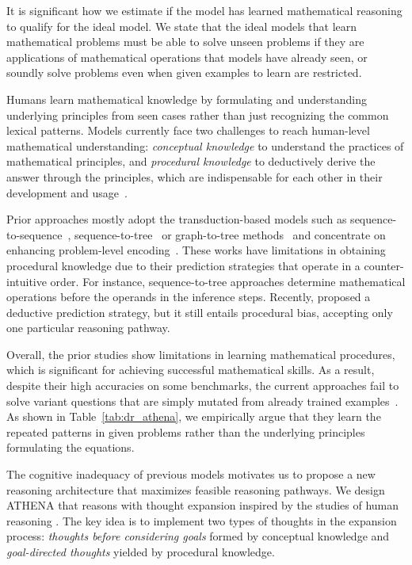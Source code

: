\documentclass[11pt]{article}
\newcommand{\1}{\mathbb{1}}
\begin{document}
It is significant how we estimate if the model has learned mathematical reasoning to qualify for the ideal model.
We state that the ideal models that learn mathematical problems must be able to solve unseen problems if they are applications of mathematical operations that models have already seen, or soundly solve problems even when given examples to learn are restricted.

Humans learn mathematical knowledge by formulating and understanding underlying principles from seen cases rather than just recognizing the common lexical patterns.
Models currently face two challenges to reach human-level mathematical understanding: \textit{conceptual knowledge} to understand the practices of mathematical principles, and \textit{procedural knowledge} to deductively derive the answer through the principles, which are indispensable for each other in their development and usage~\citep{rittle1999conceptual, byrnes1991role, canobi2009concept, rittle-etal-2014-developing}.

Prior approaches mostly adopt the transduction-based models such as sequence-to-sequence~\citep{ling-etal-2017-program, wang-etal-2018-translating}, sequence-to-tree~\citep{xie-sun-2019-goal, liu-etal-2019-tree} or graph-to-tree methods~\citep{zhang-etal-2020-graph-tree, li-etal-2020-graph-tree} and concentrate on enhancing problem-level encoding~\citep{shen-jin-2020-solving, zhang-etal-2020-graph-tree, lin-etal-2021-hms, yu-etal-2021-improving}.
These works have limitations in obtaining procedural knowledge due to their prediction strategies that operate in a counter-intuitive order.
For instance, sequence-to-tree approaches determine mathematical operations before the operands in the inference steps.
Recently, \citet{jie-etal-2022-learning} proposed a deductive prediction strategy, but it still entails procedural bias, accepting only one particular reasoning pathway.

Overall, the prior studies show limitations in learning mathematical procedures, which is significant for achieving successful mathematical skills.
As a result, despite their high accuracies on some benchmarks, the current approaches fail to solve variant questions that are simply mutated from already trained examples~\citep{patel-etal-2021-nlp, yang-etal-2022-unbiased}.
As shown in Table~\ref{tab:dr_athena}, we empirically argue that they learn the repeated patterns in given problems rather than the underlying principles formulating the equations.

The cognitive inadequacy of previous models motivates us to propose a new reasoning architecture that maximizes feasible reasoning pathways.
We design ATHENA that reasons with thought expansion inspired by the studies of human reasoning
\citep{johnson2008we, rittle-etal-2014-developing}.
The key idea is to implement two types of thoughts in the expansion process: \textit{thoughts before considering goals} formed by conceptual knowledge and \textit{goal-directed thoughts} yielded by procedural knowledge.
\end{document}
